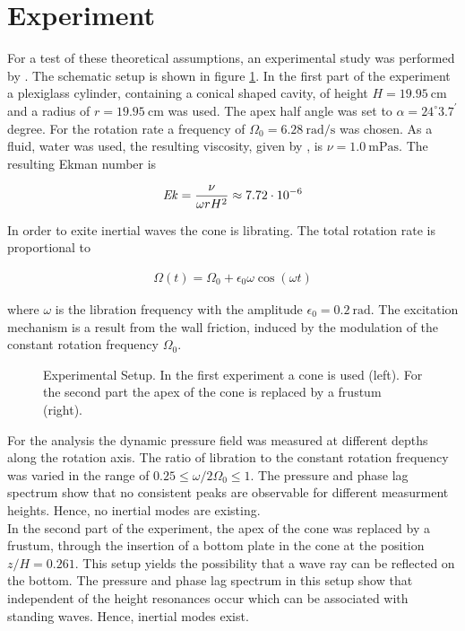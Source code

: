 \section{Experiment}
\label{cone:theorie_exp}

For a test of these theoretical assumptions, an experimental study was performed by \citep{Beardsley1970}.
The schematic setup is shown in figure \ref{cone:setup_experiment}.
In the first part of the experiment a plexiglass cylinder, containing a conical shaped cavity,
of height $H=\SI{19.95}{\centi\meter}$ and a radius of $r=\SI{19.95}{\centi\meter}$ was used.
The apex half angle was set to $\alpha=24^{\circ}3.7^{\prime}$ degree.
For the rotation rate a frequency of $\Omega_0 =\SI{6.28}{\radian\per\second}$ was chosen.
As a fluid, water was used, the resulting viscosity, given by \citep{tipler2003}, is $\nu = \SI{1.0}{\milli\pascal\second}$.
The resulting Ekman number is

\begin{align}
    \mbox{\textit{Ek}} = \frac{\nu}{\omega r H^2} \approx 7.72\cdot 10^{-6}
\end{align}

In order to exite inertial waves the cone is librating.
The total rotation rate is proportional to

\begin{align}
\Omega(t) = \Omega_0 + \epsilon_0 \omega \cos(\omega t)
\end{align}

where $\omega$ is the libration frequency with the amplitude $\epsilon_0=\SI{0.2}{\radian}$.
The excitation mechanism is a result from the wall friction, induced
by the modulation of the constant rotation frequency $\Omega_0$.

\begin{figure}[!b]
      \centering
      \caption{
          Experimental Setup. In the first experiment a cone is used (left). For the second part the apex of the cone
          is replaced by a frustum (right).
      \label{cone:setup_experiment}
      }
\end{figure}

For the analysis the dynamic pressure field was measured at different depths along the rotation axis.
The ratio of libration to the constant rotation frequency was varied in the range of ${0.25\leq\omega/2\Omega_0\leq1}$.
The pressure and phase lag spectrum  show that no consistent peaks are observable for different measurment heights.
Hence, no inertial modes are existing.
\\
In the second part of the experiment, the apex of the cone was replaced by a frustum, through the
insertion of a bottom plate in the cone at the position $z/H = 0.261$.
This setup yields the possibility that a wave ray can be reflected on the bottom.
The pressure and phase lag spectrum in this setup show that
independent of the height resonances occur which can be associated with standing waves.
Hence, inertial modes exist.

